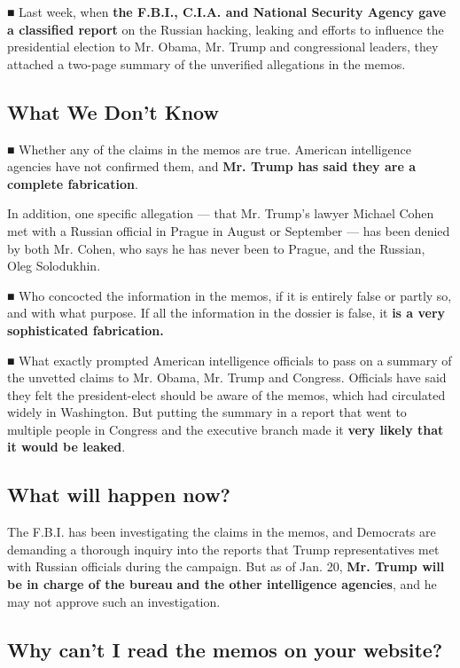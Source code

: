 ■ Last week, when \textbf{the F.B.I., C.I.A. and National Security
Agency gave a classified report} on the Russian hacking, leaking and
efforts to influence the presidential election to Mr. Obama, Mr. Trump
and congressional leaders, they attached a two-page summary of the
unverified allegations in the memos.

\hypertarget{what-we-dont-know}{%
\subsection{What We Don't Know}\label{what-we-dont-know}}

■ Whether any of the claims in the memos are true. American intelligence
agencies have not confirmed them, and \textbf{Mr. Trump has said they
are a complete fabrication}.

In addition, one specific allegation --- that Mr. Trump's lawyer Michael
Cohen met with a Russian official in Prague in August or September ---
has been denied by both Mr. Cohen, who says he has never been to Prague,
and the Russian, Oleg Solodukhin.

■ Who concocted the information in the memos, if it is entirely false or
partly so, and with what purpose. If all the information in the dossier
is false, it \textbf{is a very sophisticated fabrication.}

■ What exactly prompted American intelligence officials to pass on a
summary of the unvetted claims to Mr. Obama, Mr. Trump and Congress.
Officials have said they felt the president-elect should be aware of the
memos, which had circulated widely in Washington. But putting the
summary in a report that went to multiple people in Congress and the
executive branch made it \textbf{very likely that it would be leaked}.

\hypertarget{what-will-happen-now}{%
\subsection{What will happen now?}\label{what-will-happen-now}}

The F.B.I. has been investigating the claims in the memos, and Democrats
are demanding a thorough inquiry into the reports that Trump
representatives met with Russian officials during the campaign. But as
of Jan. 20, \textbf{Mr. Trump will be in charge of the bureau}
\textbf{and the other intelligence agencies}, and he may not approve
such an investigation.

\hypertarget{why-cant-i-read-the-memos-on-your-website}{%
\subsection{Why can't I read the memos on your
website?}\label{why-cant-i-read-the-memos-on-your-website}}

